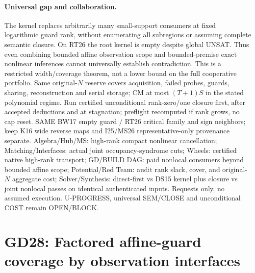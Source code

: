 \documentclass[11pt]{article}
\begin{document}
\paragraph{Universal gap and collaboration.}
The kernel replaces arbitrarily many small-support consumers at fixed logarithmic guard rank, without enumerating all subregions or assuming complete semantic closure. On RT26 the root kernel is empty despite global UNSAT. Thus even combining bounded affine observation scope and bounded-premise exact nonlinear inferences cannot universally establish contradiction. This is a restricted width/coverage theorem, not a lower bound on the full cooperative portfolio. Same original-$N$ reserve covers acquisition, failed probes, guards, sharing, reconstruction and serial storage; CM at most $(T+1)S$ in the stated polynomial regime. Run certified unconditional rank-zero/one closure first, after accepted deductions and at stagnation; preflight recomputed if rank grows, no cap reset. SAME BW17 empty guard / RT26 critical family and sign neighbors; keep K16 wide reverse maps and I25/MS26 representative-only provenance separate. Algebra/Hub/MS: high-rank compact nonlinear cancellation; Matching/Interfaces: actual joint occupancy-syndrome cuts; Wheels: certified native high-rank transport; GD/BUILD DAG: paid nonlocal consumers beyond bounded affine scope; Potential/Red Team: audit rank slack, cover, and original-$N$ aggregate cost; Solver/Synthesis: direct-first vs DS15 kernel plus closure vs joint nonlocal passes on identical authenticated inputs. Requests only, no assumed execution. U-PROGRESS, universal SEM/CLOSE and unconditional COST remain OPEN/BLOCK.


\section{GD28: Factored affine-guard coverage by observation interfaces}\label{sec:gd28}
\end{document}
